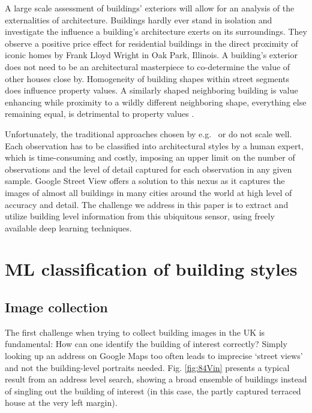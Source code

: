 \documentclass[]{article}
\begin{document}
A large scale assessment of buildings' exteriors will allow for an
analysis of the externalities of architecture. Buildings hardly ever
stand in isolation and \textcite{Ahlfeldt2012} investigate the influence
a building's architecture exerts on its surroundings. They observe a
positive price effect for residential buildings in the direct proximity
of iconic homes by Frank Lloyd Wright in Oak Park, Illinois. A
building's exterior does not need to be an architectural masterpiece to
co-determine the value of other houses close by. Homogeneity of building
shapes within street segments does influence property values. A
similarly shaped neighboring building is value enhancing while proximity
to a wildly different neighboring shape, everything else remaining
equal, is detrimental to property values \autocite{Lindenthal2017b}.

Unfortunately, the traditional approaches chosen by
e.g.~\textcite{Buitelaar2017} or \textcite{Ahlfeldt2012} do not scale
well. Each observation has to be classified into architectural styles by
a human expert, which is time-consuming and costly, imposing an upper
limit on the number of observations and the level of detail captured for
each observation in any given sample. Google Street View offers a
solution to this nexus as it captures the images of almost all buildings
in many cities around the world at high level of accuracy and detail.
The challenge we address in this paper is to extract and utilize
building level information from this ubiquitous sensor, using freely
available deep learning techniques.

\hypertarget{ml-classification-of-building-styles}{%
\section{ML classification of building
styles}\label{ml-classification-of-building-styles}}

\hypertarget{image-collection}{%
\subsection{Image collection}\label{image-collection}}

The first challenge when trying to collect building images in the UK is
fundamental: How can one identify the building of interest correctly?
Simply looking up an address on Google Maps too often leads to imprecise
`street views' and not the building-level portraits needed. Fig.
\ref{fig:84Vin} presents a typical result from an address level search,
showing a broad ensemble of buildings instead of singling out the
building of interest (in this case, the partly captured terraced house
at the very left margin).
\end{document}
